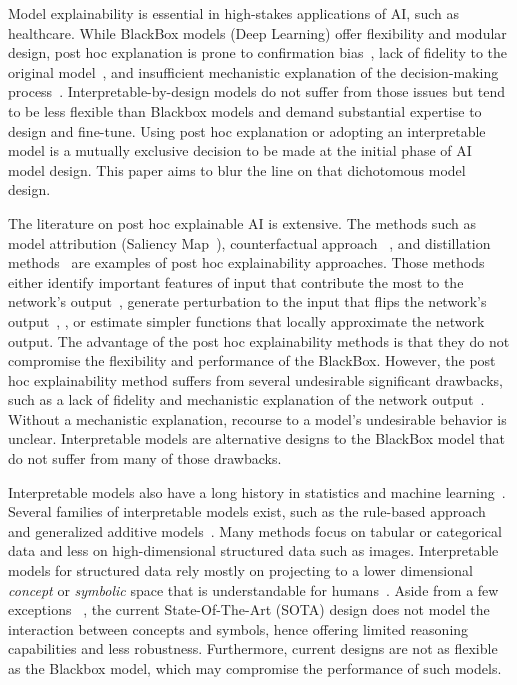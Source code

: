  
Model explainability is essential in high-stakes applications of AI, such as healthcare. While BlackBox models (\eg Deep Learning) offer flexibility and modular design, post hoc explanation is prone to confirmation bias~\cite{wan2022explainability}, lack of fidelity to the original model~\cite{adebayo2018sanity}, and insufficient mechanistic explanation of the decision-making process~\cite{rudin2019stop}. Interpretable-by-design models do not suffer from those issues but tend to be less flexible than Blackbox models and demand substantial expertise to design and fine-tune. Using post hoc explanation or adopting an interpretable model is a mutually exclusive decision to be made at the initial phase of AI model design. This paper aims to blur the line on that dichotomous model design. 

The literature on post hoc explainable AI is extensive. The methods such as model attribution (\eg Saliency Map~\cite{simonyan2013deep, selvaraju2017grad}), counterfactual approach ~\cite{abid2021meaningfully, singla2019explanation}, and distillation methods~\cite{alharbi2021learning, cheng2020explaining} are examples of post hoc explainability approaches. Those methods either identify important features of input that contribute the most to the network's output~\cite{shrikumar2016not}, generate perturbation to the input that flips the network's output~\cite{samek2016evaluating}, \cite{montavon2018methods}, or estimate simpler functions that locally approximate the network output. The advantage of the post hoc explainability methods is that they do not compromise the flexibility and performance of the BlackBox. However, the post hoc explainability method suffers from several undesirable significant drawbacks, such as a lack of fidelity and mechanistic explanation of the network output~\cite{rudin2019stop}. Without a mechanistic explanation, recourse to a model's undesirable behavior is unclear. Interpretable models are alternative designs to the BlackBox model that do not suffer from many of those drawbacks. 

Interpretable models also have a long history in statistics and machine learning~\cite{letham2015interpretable, breiman1984classification}. Several families of interpretable models exist, such as the rule-based approach and generalized additive models~\cite{hastie1987generalized}. Many methods focus on tabular or categorical data and less on high-dimensional structured data such as images. Interpretable models for structured data rely mostly on projecting to a lower dimensional \emph{concept} or \emph{symbolic} space that is understandable for humans~\cite{koh2020concept}. Aside from a few exceptions ~\cite{ciravegna2021logic, barbiero2022entropy}, the current State-Of-The-Art (SOTA) design does not model the interaction between concepts and symbols, hence offering limited reasoning capabilities and less robustness. Furthermore, current designs are not as flexible as the Blackbox model, which may compromise the performance of such models. 


